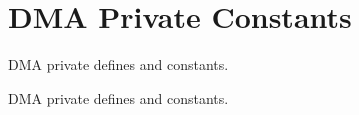 \hypertarget{group___d_m_a___private___constants}{\section{D\-M\-A Private Constants}
\label{group___d_m_a___private___constants}
}


D\-M\-A private defines and constants.  


D\-M\-A private defines and constants. 